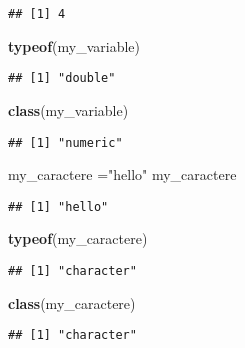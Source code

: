 \documentclass[
]{article}
\newenvironment{Shaded}{\begin{snugshade}}{\end{snugshade}}
\newcommand{\FunctionTok}[1]{\textcolor[rgb]{0.13,0.29,0.53}{\textbf{#1}}}
\newcommand{\NormalTok}[1]{#1}
\newcommand{\OtherTok}[1]{\textcolor[rgb]{0.56,0.35,0.01}{#1}}
\newcommand{\StringTok}[1]{\textcolor[rgb]{0.31,0.60,0.02}{#1}}
\begin{document}
\begin{verbatim}
## [1] 4
\end{verbatim}

\begin{Shaded}
\begin{Highlighting}[]
\FunctionTok{typeof}\NormalTok{(my\_variable)}
\end{Highlighting}
\end{Shaded}

\begin{verbatim}
## [1] "double"
\end{verbatim}

\begin{Shaded}
\begin{Highlighting}[]
\FunctionTok{class}\NormalTok{(my\_variable)}
\end{Highlighting}
\end{Shaded}

\begin{verbatim}
## [1] "numeric"
\end{verbatim}

\begin{Shaded}
\begin{Highlighting}[]
\NormalTok{my\_caractere }\OtherTok{=}\StringTok{"hello"}
\NormalTok{my\_caractere}
\end{Highlighting}
\end{Shaded}

\begin{verbatim}
## [1] "hello"
\end{verbatim}

\begin{Shaded}
\begin{Highlighting}[]
\FunctionTok{typeof}\NormalTok{(my\_caractere)}
\end{Highlighting}
\end{Shaded}

\begin{verbatim}
## [1] "character"
\end{verbatim}

\begin{Shaded}
\begin{Highlighting}[]
\FunctionTok{class}\NormalTok{(my\_caractere)}
\end{Highlighting}
\end{Shaded}

\begin{verbatim}
## [1] "character"
\end{verbatim}
\end{document}
